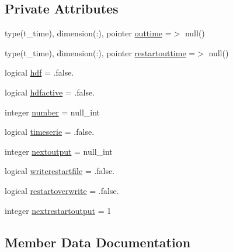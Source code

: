 \subsection*{Private Attributes}
\begin{DoxyCompactItemize}
\item 
type(t\+\_\+time), dimension(\+:), pointer \mbox{\hyperlink{structmodulereservoirs_1_1t__output_a5efbfc53d6ef7dd24dd86db64c9487f3}{outtime}} =$>$ null()
\item 
type(t\+\_\+time), dimension(\+:), pointer \mbox{\hyperlink{structmodulereservoirs_1_1t__output_a422a89b3244839d1475c23c929c10927}{restartouttime}} =$>$ null()
\item 
logical \mbox{\hyperlink{structmodulereservoirs_1_1t__output_a343d46fa68e8099aaf5984a9e47ef9c4}{hdf}} = .false.
\item 
logical \mbox{\hyperlink{structmodulereservoirs_1_1t__output_a26c8bbd81c50a456e3b601c53f9b687e}{hdfactive}} = .false.
\item 
integer \mbox{\hyperlink{structmodulereservoirs_1_1t__output_ad75b33a2f9e7a9813876355d91694c72}{number}} = null\+\_\+int
\item 
logical \mbox{\hyperlink{structmodulereservoirs_1_1t__output_acbc7c2d2ac605a566882ad64764737f1}{timeserie}} = .false.
\item 
integer \mbox{\hyperlink{structmodulereservoirs_1_1t__output_a89a6f79b8cab672133a4ba3a8a36031a}{nextoutput}} = null\+\_\+int
\item 
logical \mbox{\hyperlink{structmodulereservoirs_1_1t__output_a21c11480dfaabf538e6df98759ddceea}{writerestartfile}} = .false.
\item 
logical \mbox{\hyperlink{structmodulereservoirs_1_1t__output_a0cc2af35891d09324bb7c5096b24414c}{restartoverwrite}} = .false.
\item 
integer \mbox{\hyperlink{structmodulereservoirs_1_1t__output_aba90733251424d7ba2cc6cdaed305dea}{nextrestartoutput}} = 1
\end{DoxyCompactItemize}


\subsection{Member Data Documentation}
\mbox{\label{structmodulereservoirs_1_1t__output_a343d46fa68e8099aaf5984a9e47ef9c4}} 
